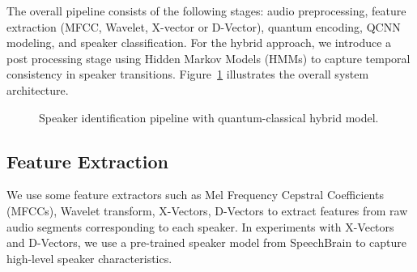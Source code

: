 \documentclass[conference]{IEEEtran}
\begin{document}
The overall pipeline consists of the following stages: audio preprocessing, feature extraction (MFCC, Wavelet, X-vector or D-Vector), quantum encoding, QCNN modeling, and speaker classification. For the hybrid approach, we introduce a post processing stage using Hidden Markov Models (HMMs) to capture temporal consistency in speaker transitions. Figure~\ref{fig:pipeline} illustrates the overall system architecture.
\begin{figure}[ht]
    \centering
    \caption{Speaker identification pipeline with quantum-classical hybrid model.}
    \label{fig:pipeline}
\end{figure}
\subsection{Feature Extraction}

We use some feature extractors such as Mel Frequency Cepstral Coefficients (MFCCs), Wavelet transform, X-Vectors, D-Vectors to extract features from raw audio segments corresponding to each speaker. In experiments with X-Vectors and D-Vectors, we use a pre-trained speaker model from SpeechBrain to capture high-level speaker characteristics.
\end{document}
